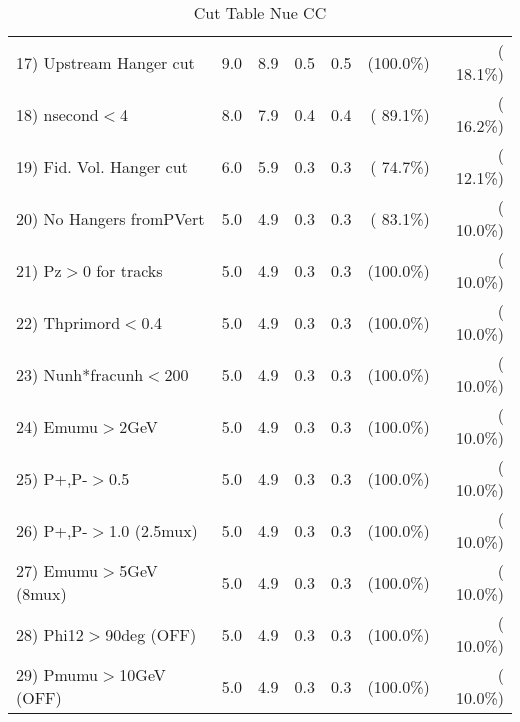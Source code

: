 \begin{table}[h!]
\begin{tabular}{||l||r|r|r|r|r|r||}
 17) Upstream Hanger cut  &          9.0 &          8.9 &          0.5 &          0.5 & (100.0\%) & ( 18.1\%) \\
 18) nsecond$<$4          &          8.0 &          7.9 &          0.4 &          0.4 & ( 89.1\%) & ( 16.2\%) \\
 19) Fid. Vol. Hanger cut &          6.0 &          5.9 &          0.3 &          0.3 & ( 74.7\%) & ( 12.1\%) \\
 20) No Hangers fromPVert &          5.0 &          4.9 &          0.3 &          0.3 & ( 83.1\%) & ( 10.0\%) \\
 21) Pz$>$0 for tracks    &          5.0 &          4.9 &          0.3 &          0.3 & (100.0\%) & ( 10.0\%) \\
 22) Thprimord$<$0.4      &          5.0 &          4.9 &          0.3 &          0.3 & (100.0\%) & ( 10.0\%) \\
 23) Nunh*fracunh$<$200   &          5.0 &          4.9 &          0.3 &          0.3 & (100.0\%) & ( 10.0\%) \\
 24) Emumu$>$2GeV         &          5.0 &          4.9 &          0.3 &          0.3 & (100.0\%) & ( 10.0\%) \\
 25) P+,P-$>$0.5          &          5.0 &          4.9 &          0.3 &          0.3 & (100.0\%) & ( 10.0\%) \\
 26) P+,P-$>$1.0 (2.5mux) &          5.0 &          4.9 &          0.3 &          0.3 & (100.0\%) & ( 10.0\%) \\
 27) Emumu$>$5GeV  (8mux) &          5.0 &          4.9 &          0.3 &          0.3 & (100.0\%) & ( 10.0\%) \\
 28) Phi12$>$90deg  (OFF) &          5.0 &          4.9 &          0.3 &          0.3 & (100.0\%) & ( 10.0\%) \\
 29) Pmumu$>$10GeV  (OFF) &          5.0 &          4.9 &          0.3 &          0.3 & (100.0\%) & ( 10.0\%) \\
 \hline
 \hline
 \end{tabular}
 \caption{Cut Table   Nue CC  }
 \label{tab-cutcohjpsi-mumu_nuecc}
 \end{table}
